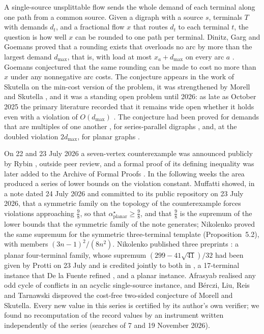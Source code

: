 \documentclass[11pt]{article}
\theoremstyle{remark}
\newcommand{\dmax}{d_{\max}}
\begin{document}
A single-source unsplittable flow sends the whole demand of each terminal along one path from a common
source. Given a digraph with a source $s$, terminals $T$ with demands $d_t$, and a fractional flow $x$ that
routes $d_t$ to each terminal $t$, the question is how well $x$ can be rounded to one path per terminal. Dinitz,
Garg and Goemans proved that a rounding exists that overloads no arc by more than the largest demand
$\dmax$, that is, with load at most $x_a+\dmax$ on every arc $a$ \cite{DGG99}. Goemans conjectured that the same
rounding can be made to cost no more than $x$ under any nonnegative arc costs. The conjecture appears in
the work of Skutella \cite{Sku02} on the min-cost version of the problem, it was strengthened by Morell and
Skutella \cite{MS22}, and it was a standing open problem until 2026: as late as October 2025 the primary
literature recorded that it remains wide open whether it holds even with a violation of $O(\dmax)$
\cite{STVZ25}. The conjecture had been proved for demands that are multiples of one another
\cite{Sku02}, for series-parallel digraphs \cite{MSW25}, and, at the doubled violation $2\dmax$, for planar
graphs \cite{TVZ24}.

On 22 and 23 July 2026 a seven-vertex counterexample was announced publicly by Rybin \cite{Ryb26}, outside
peer review, and a formal proof of its defining inequality was later added to the Archive of Formal Proofs
\cite{AFP26}. In the following weeks the area produced a series of lower bounds on the violation constant. Muffatti
\cite{Muf26} showed, in a note dated 24 July 2026 and committed to its public repository on 23 July 2026, that a symmetric family on the topology of the counterexample forces violations
approaching $\tfrac98$, so that $\alpha^\star_{\mathrm{planar}}\ge\tfrac98$, and that $\tfrac98$ is the supremum of the lower bounds that the symmetric family of the note generates;
Nikolenko \cite{Nik1} proved the same supremum for the symmetric three-terminal template (Proposition~5.2), with members
$(3n-1)^2/(8n^2)$. Nikolenko published three preprints \cite{Nik1,Nik2,Nik3}: a planar four-terminal family, whose
supremum $(299-41\sqrt{41})/32$ had been given by Protti \cite{Pro26} on 23 July and is credited jointly to both in
\cite{Nik3}, a 17-terminal instance that De la Fuente refined \cite{DLF26}, and a planar instance.
Afrasyab \cite{Afr26} realised any odd cycle of conflicts in an acyclic single-source instance, and Bérczi, Liu,
Reis and Tarnawski \cite{BLRT26} disproved the cost-free two-sided conjecture of Morell and Skutella. Every
new value in this series is certified by its author's own verifier; we found no recomputation of the record values by an
instrument written independently of the series (searches of 7 and 19 November 2026).
\end{document}
